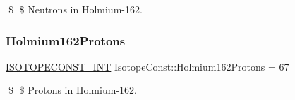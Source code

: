 \$ \$ Neutrons in Holmium-\/162. \mbox{\label{group___isotope_const-_holmium-_ho162_ga0352eae3823d1e5e9c8a71739d08b44c}} 
\subsubsection{\texorpdfstring{Holmium162\+Protons}{Holmium162Protons}}
{\footnotesize\ttfamily \mbox{\hyperlink{group___isotope_const-_macros_ga5f18360b3e99483a35c32d789e62621c}{I\+S\+O\+T\+O\+P\+E\+C\+O\+N\+S\+T\+\_\+\+I\+NT}} Isotope\+Const\+::\+Holmium162\+Protons = 67}

\$ \$ Protons in Holmium-\/162. 